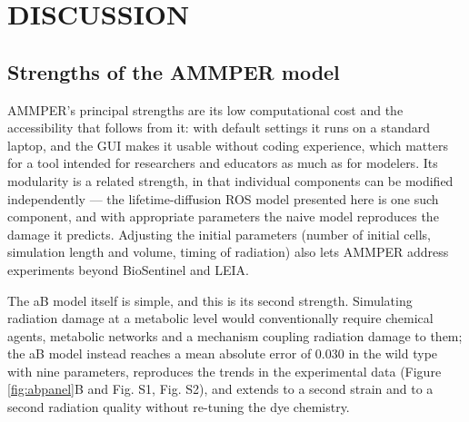 \documentclass{asmarticle}
\begin{document}
\section{DISCUSSION}

\subsection{Strengths of the AMMPER model}
AMMPER's principal strengths are its low computational cost and the accessibility that follows from it: with default settings it runs on a standard laptop, and the GUI makes it usable without coding experience, which matters for a tool intended for researchers and educators as much as for modelers. Its modularity is a related strength, in that individual components can be modified independently --- the lifetime-diffusion ROS model presented here is one such component, and with appropriate parameters the naive model reproduces the damage it predicts. Adjusting the initial parameters (number of initial cells, simulation length and volume, timing of radiation) also lets AMMPER address experiments beyond BioSentinel and LEIA.

The aB model itself is simple, and this is its second strength. Simulating radiation damage at a metabolic level would conventionally require chemical agents, metabolic networks and a mechanism coupling radiation damage to them; the aB model instead reaches a mean absolute error of 0.030 in the wild type with nine parameters, reproduces the trends in the experimental data (Figure \ref{fig:abpanel}B and Fig. S1, Fig. S2), and extends to a second strain and to a second radiation quality without re-tuning the dye chemistry.
\end{document}
